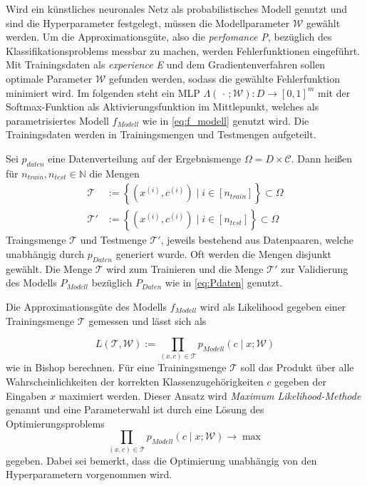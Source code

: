 Wird ein künstliches neuronales Netz als probabilistisches Modell genutzt und sind die Hyperparameter festgelegt, müssen die Modellparameter $\mathcal{W}$ gewählt werden. Um die Approximationsgüte, also die \textit{perfomance P}, bezüglich des Klassifikationsproblems messbar zu machen, werden Fehlerfunktionen eingeführt. 
Mit Trainingsdaten als \textit{experience E} und dem Gradientenverfahren\cite{nocedal1999numerical} sollen optimale Parameter $\mathcal{W}$ gefunden werden, sodass die gewählte Fehlerfunktion minimiert wird. Im folgenden steht ein MLP $\Lambda(\, \cdot \, ; \mathcal{W}): D \rightarrow [0,1]^m$  mit der Softmax-Funktion als Aktivierungsfunktion im Mittlepunkt, welches als parametrisiertes Modell $f_{Modell}$ wie in \ref{eq:f_modell} genutzt wird.
Die Trainingsdaten werden in Trainingsmengen und Testmengen aufgeteilt.

\begin{defi}
    Sei $p_{daten}$ eine Datenverteilung auf der Ergebnismenge $\Omega=D \times \mathcal{C}$. Dann heißen für $n_{train}, n_{test} \in \mathbb{N}$ die Mengen
    \begin{align*}
        \mathcal{T} &:= \left\{ (x^{(i)},c^{(i)}) \; | \; i \in [n_{train}] \right\} \subset \Omega \\
        \mathcal{T}' &:= \left\{ (x^{(i)},c^{(i)}) \; | \; i \in [n_{test}] \right\} \subset \Omega
    \end{align*}
    Traingsmenge $\mathcal{T}$ und Testmenge $\mathcal{T}'$, jeweils bestehend aus Datenpaaren, welche unabhängig durch $p_{Daten}$ generiert wurde. Oft werden die Mengen disjunkt gewählt. Die Menge $\mathcal{T}$ wird zum Trainieren und die Menge $\mathcal{T}'$ zur Validierung des Modells $P_{Modell}$ bezüglich $P_{Daten}$ wie in \ref{eq:Pdaten} genutzt.
\end{defi}

Die Approximationsgüte des Modells $f_{Modell}$ wird als Likelihood gegeben einer Trainingsmenge $\mathcal{T}$ gemessen und lässt sich als 

\begin{equation}
    \label{eq:likelihood}
    L(\mathcal{T},\mathcal{W}):=\prod_{(x,c) \in \mathcal{T}} p_{Modell}(c \; | \; x; \mathcal{W})
\end{equation}
wie in Bishop\cite{bishop2006pattern} berechnen.
Für eine Trainingsmenge $\mathcal{T}$ soll das Produkt über alle Wahrscheinlichkeiten der korrekten Klassenzugehörigkeiten $c$ gegeben der Eingaben $x$ maximiert werden. Dieser Ansatz wird \textit{Maximum Likelihood-Methode}\cite{ruschendorf2014mathematische} genannt und eine Parameterwahl ist durch eine Lösung des Optimierungsproblems 
\begin{equation}
    \label{eq:opt_likelihood}
     \prod_{(x,c) \in \mathcal{T}} p_{Modell}(c \; | \; x; \mathcal{W}) \rightarrow \max
\end{equation}
gegeben. Dabei sei bemerkt, dass die Optimierung unabhängig von den Hyperparametern vorgenommen wird.


